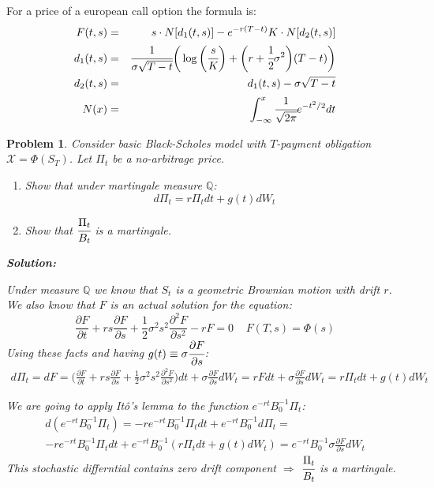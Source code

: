 \documentclass[a4paper, 12pt]{article}
\theoremstyle{problemstyle}
\newtheorem{problem}{Problem}[section]
\newenvironment{solution}
{\textit{\textbf{Solution:}}}
{}
\begin{document}
For a price of a  european call option the formula is:
\begin{eqnarray}
F(t, s) &=& s \cdot N[d_1(t, s)] - e^{-r(T-t)}K \cdot N[d_2(t, s)] \\
d_1(t, s) &=&  \cfrac{1}{\sigma\sqrt{T-t} }
	\bigg( 
	\log\bigg(\cfrac{s}{K}\bigg) + \bigg( r + \cfrac{1}{2} \sigma^2 \bigg)(T-t) 
	\bigg) \\
d_2(t, s) &=& d_1(t, s) - \sigma \sqrt{T-t} \\
N(x) &=& \int_{-\infty}^{x} \cfrac{1}{\sqrt{2\pi}} e^{-t^2/2}dt
\end{eqnarray}

\begin{problem}
	Consider basic Black-Scholes model with $T$-payment obligation $\mathcal{X} = \Phi(S_T)$. Let $\Pi_t$ be a no-arbitrage price.
	\begin{enumerate}
		\item[a)] Show that under martingale measure $\mathbb{Q}$:
		$$
		d\Pi_t = r \Pi_t dt + g(t) dW_t
		$$ 
		
		\item[b)]
		Show that $\cfrac{\Pi_t}{B_t}$ is a martingale.
	\end{enumerate}
	\begin{solution}
		\item[a)] Under measure $\mathbb{Q}$ we know that $S_t$ is a geometric Brownian motion with drift $r$. We also know that $F$ is an actual solution for the equation:
		$$
		\frac{\partial F}{\partial t}  +  rs \frac{\partial F}{\partial s} + \frac{1}{2} \sigma^2 s^2\frac{\partial^2 F}{\partial s^2 }
		-r F = 0
		\;\;\;\; F(T, s) = \Phi(s)
		$$  
		Using these facts and having $g(t) \equiv \sigma \cfrac{\partial F}{\partial s}$:
		\begin{multline}
		d\Pi_t = dF = \bigg(\frac{\partial F}{\partial t}  +  rs \frac{\partial F}{\partial s} + \frac{1}{2} \sigma^2s^2 \frac{\partial^2 F}{\partial s^2 }\bigg)dt + \sigma \frac{\partial F}{\partial s} dW_t = rF dt+ \sigma \frac{\partial F}{\partial s} dW_t  = r\Pi_t dt + g(t) dW_t
		\end{multline}
		
		\item[b)] We are going to apply Itô's lemma to the function $e^{-rt}B_0^{-1}\Pi_t$:
		\begin{multline}
		d(e^{-rt}B_0^{-1}\Pi_t) = -re^{-rt}B_0^{-1}\Pi_t dt +e^{-rt}B_0^{-1}d\Pi_t = \\
		 -re^{-rt}B_0^{-1}\Pi_t dt + e^{-rt}B_0^{-1}(r\Pi_t dt + g(t) dW_t) = 
		 e^{-rt}B_0^{-1} \sigma \frac{\partial F}{\partial s} dW_t
		\end{multline}
		This stochastic differntial contains zero drift component $\Rightarrow$ $\cfrac{\Pi_t}{B_t}$ is a martingale.
	\end{solution}
\end{problem}
\end{document}
